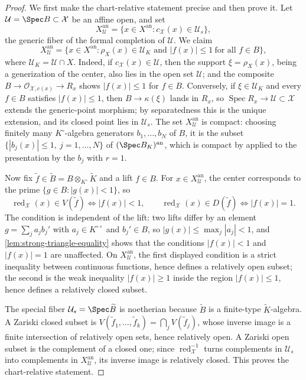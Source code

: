 \begin{proof}
We first make the chart-relative statement precise and then prove it.
Let $\mathcal U=\Spec B\subset\mathcal X$ be an affine open, and set
\[
 X^{\mathrm{an}}_{\mathcal U}
 =\{x\in X^{\mathrm{an}}:
   c_{\mathcal X}(x)\in\mathcal U_s\},
\]
the generic fiber of the formal completion of $\mathcal U$.  We claim
\[
 X^{\mathrm{an}}_{\mathcal U}
 =\{x\in X^{\mathrm{an}}:\rho_X(x)\in\mathcal U_K
   \text{ and }|f(x)|\leq1\ \text{for all }f\in B\},
\]
where $\mathcal U_K=\mathcal U\cap X$.  Indeed, if
$c_{\mathcal X}(x)\in\mathcal U$, then the support
$\xi=\rho_X(x)$, being a generization of the center, also lies in the
open set $\mathcal U$; and the composite
$B\to\mathcal O_{\mathcal X,c(x)}\to R_x$ shows $|f(x)|\leq1$ for
$f\in B$.  Conversely, if $\xi\in\mathcal U_K$ and every $f\in B$
satisfies $|f(x)|\leq1$, then $B\to\kappa(\xi)$ lands in $R_x$, so
$\operatorname{Spec}R_x\to\mathcal U\subset\mathcal X$ extends the
generic-point morphism; by separatedness this is the unique extension, and
its closed point lies in $\mathcal U_s$.  The set
$X^{\mathrm{an}}_{\mathcal U}$ is compact: choosing finitely many
$K^\circ$-algebra generators $b_1,\ldots,b_N$ of $B$, it is the
subset $\{|b_j(x)|\leq1,\ j=1,\ldots,N\}$ of
$(\Spec B_K)^{\mathrm{an}}$, which is compact by
 applied to the presentation by the
$b_j$ with $r=1$.

Now fix $\tilde f\in\widetilde B=B\otimes_{K^\circ}\widetilde K$ and a
lift $f\in B$.  For $x\in X^{\mathrm{an}}_{\mathcal U}$, the center
corresponds to the prime $\{g\in B:|g(x)|<1\}$, so
\[
 \operatorname{red}_{\mathcal X}(x)\in V(\tilde f)
 \iff|f(x)|<1,
 \qquad
 \operatorname{red}_{\mathcal X}(x)\in D(\tilde f)
 \iff|f(x)|=1 .
\]
The condition is independent of the lift: two lifts differ by an element
$g=\sum_ja_jb_j'$ with $a_j\in K^{\circ\circ}$ and $b_j'\in B$, so
$|g(x)|\leq\max_j|a_j|<1$, and \cref{lem:strong-triangle-equality}
shows that the conditions $|f(x)|<1$ and $|f(x)|=1$ are unaffected.
On $X^{\mathrm{an}}_{\mathcal U}$, the first displayed condition is a
strict inequality between continuous functions, hence defines a
relatively open subset; the second is the weak inequality
$|f(x)|\geq1$ inside the region $|f(x)|\leq1$, hence defines a
relatively closed subset.

The special fiber $\mathcal U_s=\Spec\widetilde B$ is noetherian
because $\widetilde B$ is a finite-type $\widetilde K$-algebra.  A
Zariski closed subset is $V(\tilde f_1,\ldots,\tilde f_k)
=\bigcap_jV(\tilde f_j)$, whose inverse image is a finite intersection
of relatively open sets, hence relatively open.  A Zariski open subset is
the complement of a closed one; since
$\operatorname{red}_{\mathcal X}^{-1}$ turns complements in
$\mathcal U_s$ into complements in $X^{\mathrm{an}}_{\mathcal U}$,
its inverse image is relatively closed.  This proves the chart-relative
statement.


\end{proof}
